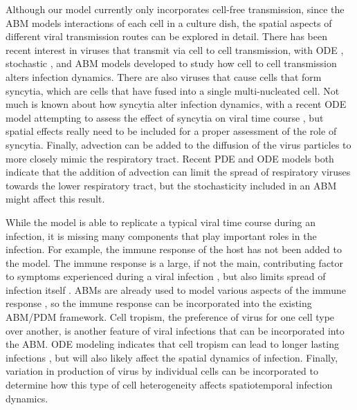 Although our model currently only incorporates cell-free transmission, since the ABM models interactions of each cell in a culture dish, the spatial aspects of different viral transmission routes can be explored in detail. There has been recent interest in viruses that transmit via cell to cell transmission, with ODE \citep{allen15,komarova13,iwami15}, stochastic \citep{graw15}, and ABM \citep{kumberger18,blahut21} models developed to study how cell to cell transmission alters infection dynamics. There are also viruses that cause cells that form syncytia, which are cells that have fused into a single multi-nucleated cell. Not much is known about how syncytia alter infection dynamics, with a recent ODE model attempting to assess the effect of syncytia on viral time course \citep{jessie21}, but spatial effects really need to be included for a proper assessment of the role of syncytia. Finally, advection can be added to the diffusion of the virus particles to more closely mimic the respiratory tract. Recent PDE \citep{quirouette20} and ODE \citep{gonzalez19} models both indicate that the addition of advection can limit the spread of respiratory viruses towards the lower respiratory tract, but the stochasticity included in an ABM might affect this result. 

While the model is able to replicate a typical viral time course during an infection, it is missing many components that play important roles in the infection. For example, the immune response of the host has not been added to the model. The immune response is a large, if not the main, contributing factor to symptoms experienced during a viral infection \citep{manchanda14,zheng18}, but also limits spread of infection itself \citep{dobrovolny13}. ABMs are already used to model various aspects of the immune response \citep{whitman20,kerepesi19,levin16}, so the immune response can be incorporated into the existing ABM/PDM framework. Cell tropism, the preference of virus for one cell type over another, is another feature of viral infections that can be incorporated into the ABM. ODE modeling indicates that cell tropism can lead to longer lasting infections \citep{dobrovolny10}, but will also likely affect the spatial dynamics of infection. Finally, variation in production of virus by individual cells \citep{timm12} can be incorporated to determine how this type of cell heterogeneity affects spatiotemporal infection dynamics.


